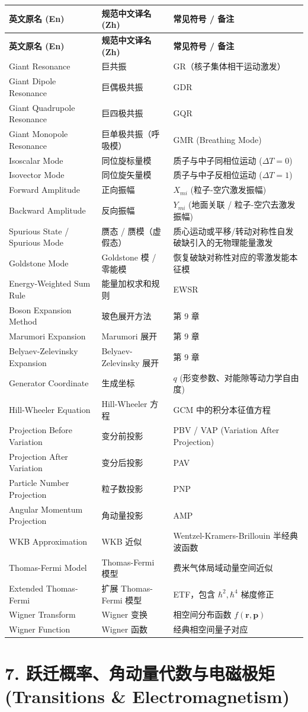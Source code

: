 \begin{longtable}{p{4.8cm} p{4.8cm} p{5.0cm}}
\toprule
\textbf{英文原名 (En)} & \textbf{规范中文译名 (Zh)} & \textbf{常见符号 / 备注} \tabularnewline
\midrule
\endfirsthead
\toprule
\textbf{英文原名 (En)} & \textbf{规范中文译名 (Zh)} & \textbf{常见符号 / 备注} \tabularnewline
\midrule
\endhead
\bottomrule
\endfoot
\bottomrule
\endlastfoot
Giant Resonance & 巨共振 & GR（核子集体相干运动激发） \tabularnewline
Giant Dipole Resonance & 巨偶极共振 & GDR \tabularnewline
Giant Quadrupole Resonance & 巨四极共振 & GQR \tabularnewline
Giant Monopole Resonance & 巨单极共振（呼吸模） & GMR (Breathing Mode) \tabularnewline
Isoscalar Mode & 同位旋标量模 & 质子与中子同相位运动 ($\Delta T = 0$) \tabularnewline
Isovector Mode & 同位旋矢量模 & 质子与中子反相位运动 ($\Delta T = 1$) \tabularnewline
Forward Amplitude & 正向振幅 & $X_{mi}$ (粒子-空穴激发振幅) \tabularnewline
Backward Amplitude & 反向振幅 & $Y_{mi}$ (地面关联 / 粒子-空穴去激发振幅) \tabularnewline
Spurious State / Spurious Mode & 赝态 / 赝模（虚假态） & 质心运动或平移/转动对称性自发破缺引入的无物理能量激发 \tabularnewline
Goldstone Mode & Goldstone 模 / 零能模 & 恢复破缺对称性对应的零激发能本征模 \tabularnewline
Energy-Weighted Sum Rule & 能量加权求和规则 & EWSR \tabularnewline
Boson Expansion Method & 玻色展开方法 & 第 9 章 \tabularnewline
Marumori Expansion & Marumori 展开 & 第 9 章 \tabularnewline
Belyaev-Zelevinsky Expansion & Belyaev-Zelevinsky 展开 & 第 9 章 \tabularnewline
Generator Coordinate & 生成坐标 & $q$ (形变参数、对能隙等动力学自由度) \tabularnewline
Hill-Wheeler Equation & Hill-Wheeler 方程 & GCM 中的积分本征值方程 \tabularnewline
Projection Before Variation & 变分前投影 & PBV / VAP (Variation After Projection) \tabularnewline
Projection After Variation & 变分后投影 & PAV \tabularnewline
Particle Number Projection & 粒子数投影 & PNP \tabularnewline
Angular Momentum Projection & 角动量投影 & AMP \tabularnewline
WKB Approximation & WKB 近似 & Wentzel-Kramers-Brillouin 半经典波函数 \tabularnewline
Thomas-Fermi Model & Thomas-Fermi 模型 & 费米气体局域动量空间近似 \tabularnewline
Extended Thomas-Fermi & 扩展 Thomas-Fermi 模型 & ETF，包含 $\hbar^2, \hbar^4$ 梯度修正 \tabularnewline
Wigner Transform & Wigner 变换 & 相空间分布函数 $f(\boldsymbol{r}, \boldsymbol{p})$ \tabularnewline
Wigner Function & Wigner 函数 & 经典相空间量子对应 \tabularnewline
\end{longtable}

\section*{7. 跃迁概率、角动量代数与电磁极矩 (Transitions \& Electromagnetism)}

